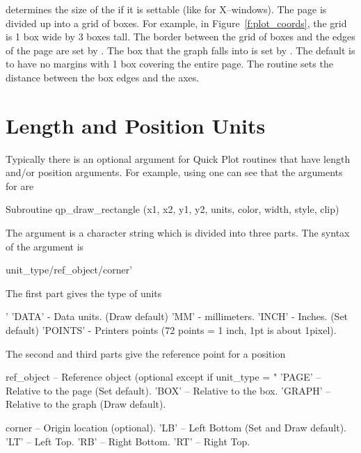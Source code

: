  determines the size of the  if it is settable (like for
X--windows). The page is divided up into a grid of boxes. For example, 
in Figure~\ref{f:plot_coords}, the grid is 1 box wide by 3 boxes tall. The border
between the grid of boxes and the edges of the page are set by .
The box that the graph falls into is set by . The default is to
have no margins with 1 box covering the entire page. The  routine
sets the distance between the box edges and the axes.


\section{Length and Position Units}
\label{s:plot_units}

Typically there is an optional  argument for Quick Plot routines that
have length and/or position arguments. For example, using  one can
see that the arguments for  are
\begin{example}
  Subroutine qp_draw_rectangle (x1, x2, y1, y2, units, color, width, style, clip)
\end{example}
The  argument is a character string which is divided into three
parts. The syntax of the  argument is
\begin{example}
  unit_type/ref_object/corner'
\end{example}
The first part  gives the type of units
\begin{example}
  '%
  'DATA'    - Data units. (Draw default)
  'MM'      - millimeters.
  'INCH'    - Inches. (Set default)
  'POINTS'  - Printers points (72 points = 1 inch, 1pt is about 1pixel).
\end{example}
The second and third parts give the reference point for a position 
\begin{example}
  ref_object -- Reference object (optional except if unit_type = "%
    'PAGE'  -- Relative to the page (Set default).
    'BOX'   -- Relative to the box.
    'GRAPH' -- Relative to the graph (Draw default).

  corner    -- Origin location (optional).
    'LB' -- Left Bottom (Set and Draw default).
    'LT' -- Left Top.
    'RB' -- Right Bottom.
    'RT' -- Right Top.
\end{example}

